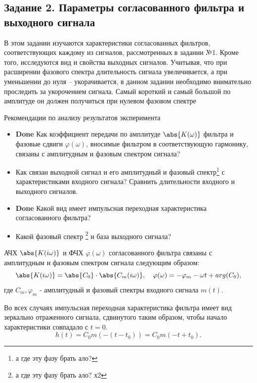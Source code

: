 \subsection{Задание 2. Параметры согласованного фильтра и выходного сигнала}
В этом задании изучаются характеристики согласованных фильтров,
соответствующих каждому из сигналов, рассмотренных в задании №1. Кроме
того, исследуются вид и свойства выходных сигналов. Учитывая, что при
расширении фазового спектра длительность сигнала увеличивается, а при
уменьшении до нуля – укорачивается, в данном задании необходимо
внимательно проследить за укорочением сигнала. Самый короткий и самый
большой по амплитуде он должен получиться при нулевом фазовом спектре


Рекомендации по анализу результатов эксперимента
\begin{itemize}
    \item \textbf{Done} Как коэффициент передачи по амплитуде $\abs{K(\omega)}$ фильтра и фазовые
    сдвиги $\varphi(\omega)$, вносимые фильтром в соответствующую гармонику,
    связаны с амплитудным и фазовым спектром сигнала?
    \item Как связан выходной сигнал и его амплитудный и фазовый спектр\footnote{а где эту фазу брать ало?} с
    характеристиками входного сигнала? Сравнить длительности
    входного и выходного сигналов.
    \item \textbf{Done} Какой вид имеет импульсная переходная характеристика
    согласованного фильтра?
    \item Какой фазовый спектр \footnote{а где эту фазу брать ало? х2} и база выходного сигнала? 
\end{itemize}

АЧХ $\abs{K(i \omega)}$ и ФЧХ $\varphi (\omega)$ согласованного фильтра связаны с 
амплитудным и фазовым спектром сигнала следующим образом:
\begin{equation}
    \abs{K(i \omega)} = \abs{C_0} \cdot \abs{C_m(i \omega)}, \quad
    \varphi (\omega) = -\varphi_m  -\omega t + arg(C_0),
\end{equation}
где $C_m, \varphi_m $ - амплитудный и фазовый спектры входного сигнала $m(t)$.

Во всех случаях импульсная переходная характеристика фильтра имеет вид зеркально отраженного сигнала, сдвинутого таким
образом, чтобы начало характеристики совпадало с $t=0$.
\begin{equation}
    h(t) = C_0 m(-(t-t_0)) = C_0 m(-t+t_0).
    \label{eq:}
\end{equation}


